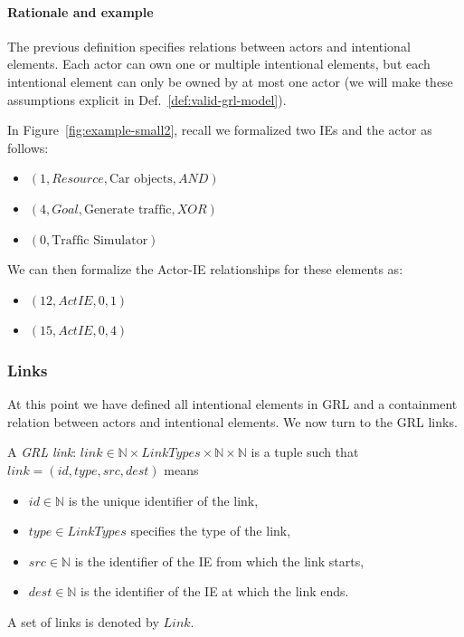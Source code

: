 \paragraph{Rationale and example} The previous definition specifies relations between actors and intentional elements. Each actor can own one or multiple intentional elements, but each intentional element can only be owned by at most one actor (we will make these assumptions explicit in Def.~\ref{def:valid-grl-model}).

In Figure~\ref{fig:example-small2}, recall we formalized two IEs and the actor as follows:
\begin{itemize}
\item $(1, Resource, \text{Car objects}, AND)$
\item $(4, Goal, \text{Generate traffic}, XOR)$
\item $(0, \text{Traffic Simulator})$
\end{itemize}

We can then formalize the Actor-IE relationships for these elements as:
\begin{itemize}
\item $(12, ActIE, 0, 1)$
\item $(15, ActIE, 0, 4)$
\end{itemize}

\subsubsection{Links}

At this point we have defined all intentional elements in GRL and a containment relation between actors and intentional elements. We now turn to the GRL links.

\begin{definition}
\label{def:link}
A \emph{GRL link}: $link\in \mathbb{N}\times LinkTypes\times \mathbb{N}\times\mathbb{N}$ is a tuple such that $link = (id,type,src,dest)$ means
\begin{itemize}
\item $id\in \mathbb{N}$ is the unique identifier of the link,
\item $type\in LinkTypes$ specifies the type of the link, 
\item $src\in \mathbb{N}$ is the identifier of the IE from which the link starts,
\item $dest\in \mathbb{N}$ is the identifier of the IE at which the link ends.
\end{itemize}

A set of links is denoted by $Link$.
\end{definition}

